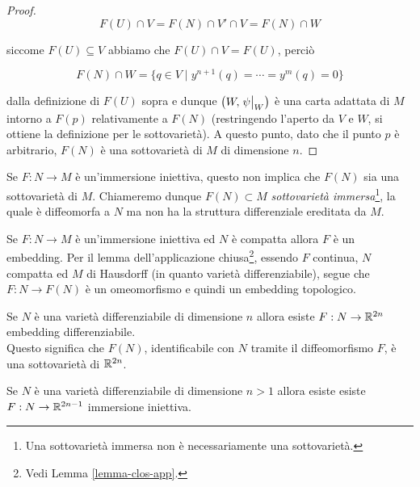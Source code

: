 \begin{proof}
	\begin{equation}
		F(U) \cap V = F(N) \cap V' \cap V = F(N) \cap W
	\end{equation}

	siccome $ F(U) \subseteq V $ abbiamo che $ F(U) \cap V = F(U) $, perciò
	
	\begin{equation}
		F(N) \cap W = \{ q \in V \mid y^{n+1}(q) = \cdots = y^{m}(q) = 0 \}
	\end{equation}

	dalla definizione di $ F(U) $ sopra e dunque $ \left( W,\eval{\psi}_{W} \right) $ è una carta adattata di $ M $ intorno a $ F(p) $ relativamente a $ F(N) $ (restringendo l'aperto da $ V $ e $ W $, si ottiene la definizione per le sottovarietà). A questo punto, dato che il punto $ p $ è arbitrario, $ F(N) $ è una sottovarietà di $ M $ di dimensione $ n $.
\end{proof}

\begin{remark}
	Se $ F : N \to M $ è un'immersione iniettiva, questo non implica che $ F(N) $ sia una sottovarietà di $ M $. Chiameremo dunque $ F(N) \subset M $ \textit{sottovarietà immersa}\footnote{%
		Una sottovarietà immersa non è necessariamente una sottovarietà.%
	}, la quale è diffeomorfa a $ N $ ma non ha la struttura differenziale ereditata da $ M $.
\end{remark}

\begin{remark}
	Se $ F : N \to M $ è un'immersione iniettiva ed $ N $ è compatta allora $ F $ è un embedding. Per il lemma dell'applicazione chiusa\footnote{%
		Vedi Lemma \ref{lemma-clos-app}.%
	}, essendo $ F $ continua, $ N $ compatta ed $ M $ di Hausdorff (in quanto varietà differenziabile), segue che $ F : N \to F(N) $ è un omeomorfismo e quindi un embedding topologico.
\end{remark}

\begin{theorem}[Whitney]
	Se $ N $ è una varietà differenziabile di dimensione $ n $ allora esiste $ F : N \to \mathbb{R}^{2n} $ embedding differenziabile.\\
	Questo significa che $ F(N) $, identificabile con $ N $ tramite il diffeomorfismo $ F $, è una sottovarietà di $ \mathbb{R}^{2n} $.
\end{theorem}

\begin{theorem}
	Se $ N $ è una varietà differenziabile di dimensione $ n>1 $ allora esiste esiste $ F : N \to \mathbb{R}^{2n-1} $ immersione iniettiva.
\end{theorem}

